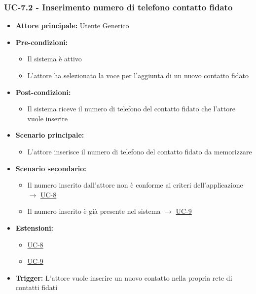 \documentclass[a4paper,12pt]{article}
\begin{document}
\subsubsection{UC-7.2 - Inserimento numero di telefono contatto fidato} \label{subsec:UC-7.2}
\begin{itemize}
    \item \textbf{Attore principale:} Utente Generico
    \item \textbf{Pre-condizioni:}
    \begin{itemize}
        \item Il sistema è attivo
        \item L'attore ha selezionato la voce per l'aggiunta di un nuovo contatto fidato
    \end{itemize}
    \item \textbf{Post-condizioni:} 
    \begin{itemize}
        \item Il sistema riceve il numero di telefono del contatto fidato che l'attore vuole inserire
    \end{itemize}
    \item \textbf{Scenario principale:} 
    \begin{itemize}
        \item L'attore inserisce il numero di telefono del contatto fidato da memorizzare
    \end{itemize}
    \item \textbf{Scenario secondario:}
    \begin{itemize}
        \item Il numero inserito dall'attore non è conforme ai criteri dell'applicazione $\rightarrow$ \hyperref[subsec:UC-8]{UC-8}
        \item Il numero inserito è già presente nel sistema $\rightarrow$ \hyperref[subsec:UC-9]{UC-9}
    \end{itemize}
    \item \textbf{Estensioni:} 
    \begin{itemize}
        \item \hyperref[subsec:UC-8]{UC-8}
        \item \hyperref[subsec:UC-9]{UC-9}
    \end{itemize}
    \item \textbf{Trigger:} L'attore vuole inserire un nuovo contatto nella propria rete di contatti fidati
\end{itemize}
\end{document}
